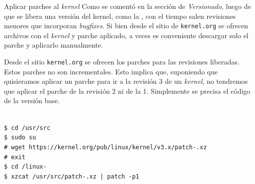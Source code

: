 \begin{frame}{Aplicar parches al \textit{kernel}}
  Como se comentó en la sección de \textit{Versionado}, luego de que se
  libera una versión del kernel, como la \KERNELBASEVERSION, con el tiempo
  salen revisiones menores que incorporan \textit{bugfixes}. Si bien desde
  el sitio de \texttt{kernel.org} se ofrecen archivos con el
  \textit{kernel} y parche aplicado, a veces es conveniente descargar solo
  el parche y aplicarlo manualmente.

  Desde el sitio \texttt{kernel.org} se ofrecen los parches para las
  revisiones liberadas. Estos parches \alert{no son incrementales}. Esto
  implica que, suponiendo que quisieramos aplicar un parche para ir a la
  revisión 3 de un \textit{kernel}, no tendremos que aplicar el parche de
  la revisión 2 ni de la 1. Simplemente se precisa el código de la versión
  base.

{ \small
  \begin{block}{}
    \texttt{\\
\$ cd /usr/src \\
\$ sudo su \\
\# wget
https://kernel.org/pub/linux/kernel/v3.x/patch-\PATCHEDKERNELVERSION.xz \\
\# exit \\
\$ cd \KERNELSOURCEPATH/linux-\KERNELBASEVERSION \\
\$ xzcat /usr/src/patch-\PATCHEDKERNELVERSION.xz | patch -p1}
\end{block} }
\end{frame}

